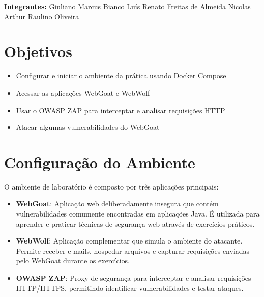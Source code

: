 \documentclass[11pt]{ifscarticle}
\begin{document}

\noindent\textbf{Integrantes:}\newline
Giuliano Marcus Bianco\newline
Luís Renato Freitas de Almeida\newline
Nicolas Arthur Raulino Oliveira

\vspace{0.5cm}

\section{Objetivos}

\begin{itemize}
    \item Configurar e iniciar o ambiente da prática usando Docker Compose
    \item Acessar as aplicações WebGoat e WebWolf
    \item Usar o OWASP ZAP para interceptar e analisar requisições HTTP
    \item Atacar algumas vulnerabilidades do WebGoat
\end{itemize}

\section{Configuração do Ambiente}

O ambiente de laboratório é composto por três aplicações principais:

\begin{itemize}
    \item \textbf{WebGoat}: Aplicação web deliberadamente insegura que contém vulnerabilidades comumente encontradas em aplicações Java. É utilizada para aprender e praticar técnicas de segurança web através de exercícios práticos.
    \item \textbf{WebWolf}: Aplicação complementar que simula o ambiente do atacante. Permite receber e-mails, hospedar arquivos e capturar requisições enviadas pelo WebGoat durante os exercícios.
    \item \textbf{OWASP ZAP}: Proxy de segurança para interceptar e analisar requisições HTTP/HTTPS, permitindo identificar vulnerabilidades e testar ataques.
\end{itemize}
\end{document}
